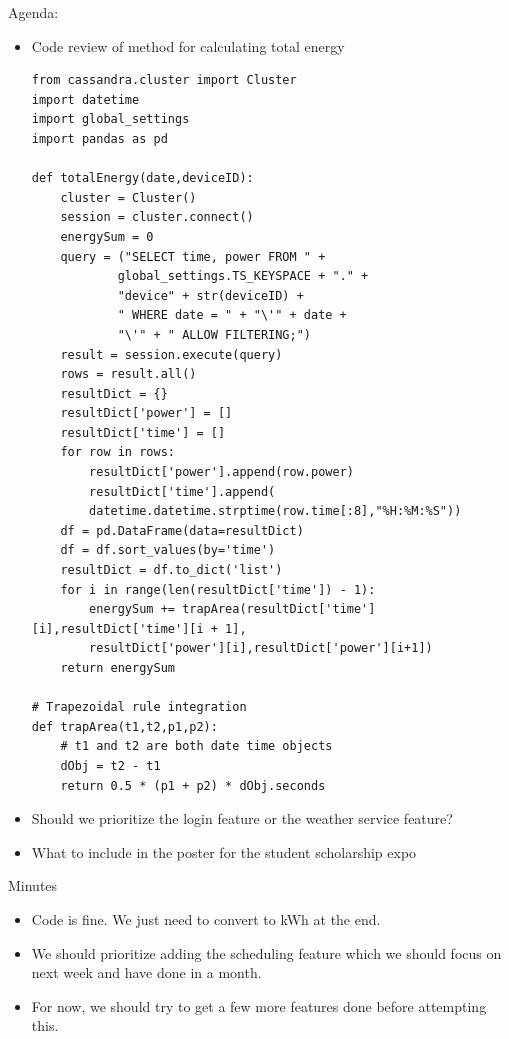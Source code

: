 \documentclass[fontsize=11pt, %
                             paper=letter, %
                             openany, %
                             captions=tableheading,
                             index=totoc,
                             hyperref]{labbook}
\begin{document}
Agenda:
\begin{itemize}
\item Code review of method for calculating total energy
\begin{Verbatim}[tabsize=4]
from cassandra.cluster import Cluster
import datetime
import global_settings
import pandas as pd

def totalEnergy(date,deviceID):
    cluster = Cluster()
    session = cluster.connect()
    energySum = 0
    query = ("SELECT time, power FROM " + 
            global_settings.TS_KEYSPACE + "." + 
            "device" + str(deviceID) + 
            " WHERE date = " + "\'" + date + 
            "\'" + " ALLOW FILTERING;")
    result = session.execute(query)
    rows = result.all()
    resultDict = {}
    resultDict['power'] = []
    resultDict['time'] = []
    for row in rows:
        resultDict['power'].append(row.power)
        resultDict['time'].append(
        datetime.datetime.strptime(row.time[:8],"%H:%M:%S"))
    df = pd.DataFrame(data=resultDict)
    df = df.sort_values(by='time')
    resultDict = df.to_dict('list')
    for i in range(len(resultDict['time']) - 1):
        energySum += trapArea(resultDict['time'][i],resultDict['time'][i + 1],
        resultDict['power'][i],resultDict['power'][i+1])
    return energySum

# Trapezoidal rule integration
def trapArea(t1,t2,p1,p2):
    # t1 and t2 are both date time objects 
    dObj = t2 - t1
    return 0.5 * (p1 + p2) * dObj.seconds
\end{Verbatim}
\item Should we prioritize the login feature or the weather service feature?
\item What to include in the poster for the student scholarship expo
\end{itemize}
Minutes
\begin{itemize}
\item Code is fine. We just need to convert to kWh at the end.
\item We should prioritize adding the scheduling feature which we should focus on next week and have done in a month.
\item For now, we should try to get a few more features done before attempting this.
\end{itemize}
\end{document}
